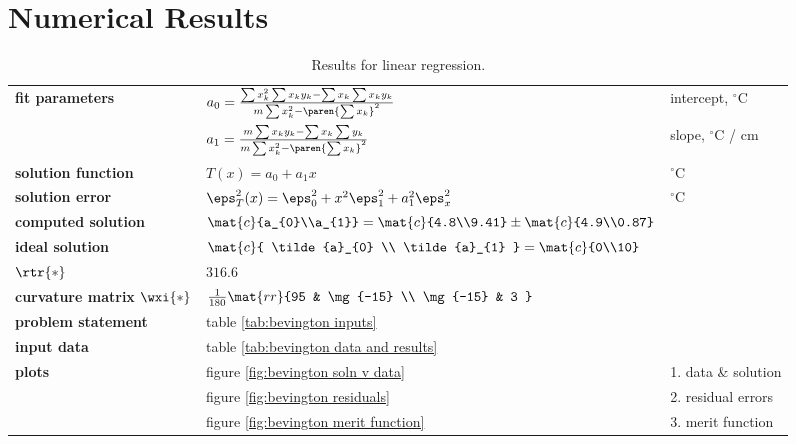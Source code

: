 \section{Numerical Results}  %

  \begin{table}[t]  %
    \caption{Results for linear regression.}
    \begin{center}
      \begin{tabular}{lll}
        \bf{fit parameters} & $a_{0} = \frac{\sum x_{k}^{2} \sum x_{k}y_{k} - \sum x_{k} \sum x_{k} y_{k}} {m \sum x_{k}^{2} - \paren{\sum x_{k}}^{2}}$ & intercept, $^{\circ}$C \\
                            & $a_{1} = \frac{m \sum x_{k}y_{k} - \sum x_{k} \sum y_{k}} {m \sum x_{k}^{2} - \paren{\sum x_{k}}^{2}}$ & slope, $^{\circ}$C / cm \\
        \bf{solution function} & $T(x) = a_{0} + a_{1} x$ & $^{\circ}$C \\
        \bf{solution error} & $\eps_{T}^{2}(x) = \eps_{0}^{2} + x^{2} \eps_{1}^{2} + a_{1}^{2} \eps_{x}^{2} $ &$^{\circ}$C \\
        \bf{computed solution} & $\mat{c}{a_{0}\\a_{1}} = \mat{c}{4.8\\9.41} \pm \mat{c}{4.9\\0.87}$ \\
        \bf{ideal solution} & $\mat{c}{ \tilde{a}_{0} \\ \tilde{a}_{1} } = \mat{c}{0\\10}$ \\
        \bf{$\rtr{*}$} & $316.6$ \\
        \bf{curvature matrix $\wxi{*}$} & $\frac{1}{180}\mat{rr}{95 & \mg{-15} \\ \mg{-15} & 3 }$\\[5pt]
        \bf{problem statement} & table \ref{tab:bevington inputs} \\
        \bf{input data}        & table \ref{tab:bevington data and results} \\
        \bf{plots}          & figure \ref{fig:bevington soln v data}    & 1. data \& solution \\
                            & figure \ref{fig:bevington residuals}      & 2. residual errors \\
                            & figure \ref{fig:bevington merit function} & 3. merit function \\
      \end{tabular}
    \end{center}
  \label{tab:bevington solution}
  \end{table}%

